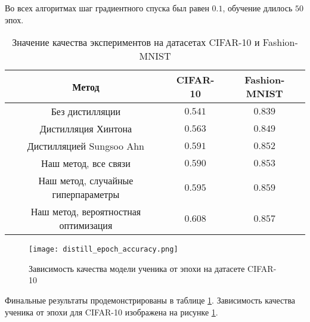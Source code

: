 Во всех алгоритмах шаг градиентного спуска был равен $0.1$, обучение длилось $50$ эпох.


\begin{table}[h!]
    \centering
    \caption{Значение качества экспериментов на датасетах CIFAR-10 и Fashion-MNIST}
    \begin{tabular}{|c|c|c|}
        \hline
        Метод                                & CIFAR-10 & Fashion-MNIST \\
        \hline \hline
        Без дистилляции                      & $0.541$  & $0.839$       \\ \hline
        Дистилляция Хинтона                  & $0.563$  & $0.849$       \\ \hline
        Дистилляцией Sungsoo Ahn             & $0.591$  & $0.852$       \\ \hline
        Наш метод, все связи                 & $0.590$  & $0.853$       \\ \hline
        Наш метод, случайные гиперпараметры  & $0.595$  & $0.859$       \\ \hline
        Наш метод, вероятностная оптимизация & $0.608$  & $0.857$       \\ \hline
    \end{tabular}
    \label{table:result_accuracy}
\end{table}

\begin{figure}[!htbp]
    \centering
    \texttt{[image: distill\_epoch\_accuracy.png]}
    \caption{Зависимость качества модели ученика от эпохи на датасете CIFAR-10}
    \label{fig:accuracy_cifar10}
\end{figure}


Финальные результаты продемонстрированы в таблице \ref{table:result_accuracy}. Зависимость качества ученика от эпохи для CIFAR-10 изображена на рисунке \ref{fig:accuracy_cifar10}.

